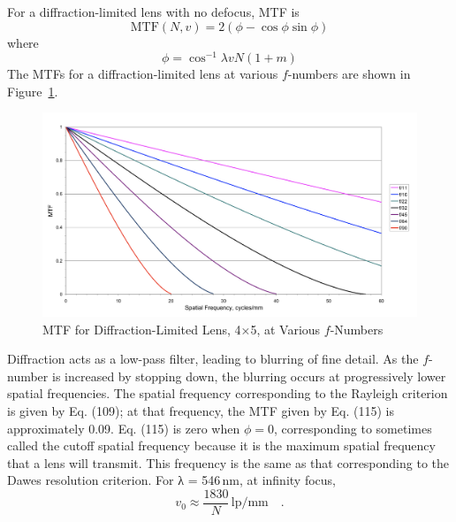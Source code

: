 \documentclass[11pt, oneside]{scrartcl}   	%
\begin{document}
For a diffraction-limited lens with no defocus, 
MTF is 
\begin{equation}
   \mathrm{MTF}(N,v) = 2(\phi - \cos\phi\sin\phi)
   \label{eq:MTF2}
\end{equation}
where
\begin{equation}
\phi = \cos^{-1}\lambda vN(1+m)
\end{equation}
The MTFs for a diffraction-limited lens at various $f$-numbers are shown in Figure~\ref{fig:MTF}.
\begin{figure}[htbp] %
   \centering
   \includegraphics[width=\linewidth]{figure/fig_dofd_6} 
   \caption{MTF for Diffraction-Limited Lens, 4×5, at Various $f$-Numbers}
   \label{fig:MTF}
\end{figure}
Diffraction acts as a low-pass filter, leading to blurring of fine detail. As the $f$-number is increased by stopping down, the blurring occurs at progressively lower spatial frequencies. The spatial frequency corresponding to the Rayleigh criterion is given by Eq. (109); at that frequency, the MTF given by Eq. (115) is approximately 0.09. Eq. (115) is zero when $\phi = 0$, corresponding to
sometimes called the cutoff spatial frequency because it is the maximum spatial frequency that a lens will transmit. This frequency is the same as that corresponding to the Dawes resolution criterion. For λ = 546\,nm, at infinity focus,
\begin{equation}
v_0 \approx \frac{1830}N\,\mathrm{lp/mm}\quad.
\end{equation}
  
\end{document}
